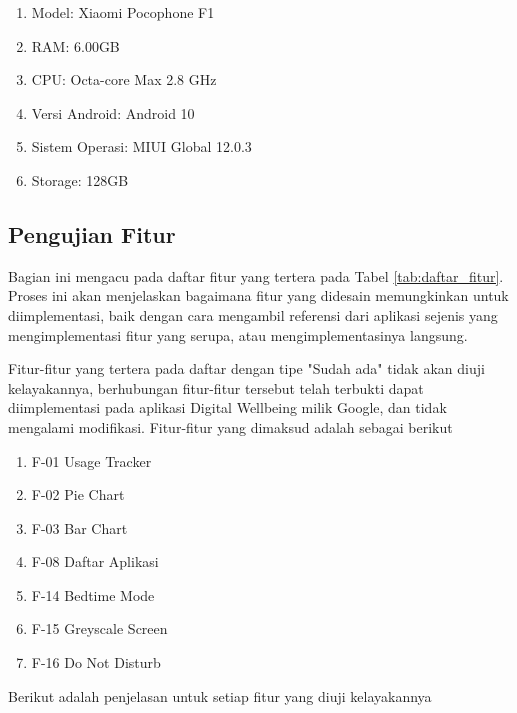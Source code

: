 \begin{enumerate}
  \item Model: Xiaomi Pocophone F1
  \item RAM: 6.00GB
  \item CPU: Octa-core Max 2.8 GHz
  \item Versi Android: Android 10
  \item Sistem Operasi: MIUI Global 12.0.3
  \item Storage: 128GB
\end{enumerate}

\subsection{Pengujian Fitur}

Bagian ini mengacu pada daftar fitur yang tertera pada Tabel \ref{tab:daftar_fitur}. Proses ini akan menjelaskan bagaimana fitur yang didesain memungkinkan untuk diimplementasi, baik dengan cara mengambil referensi dari aplikasi sejenis yang mengimplementasi fitur yang serupa, atau mengimplementasinya langsung.

Fitur-fitur yang tertera pada daftar dengan tipe "Sudah ada" tidak akan diuji kelayakannya, berhubungan fitur-fitur tersebut telah terbukti dapat diimplementasi pada aplikasi Digital Wellbeing milik Google, dan tidak mengalami modifikasi. Fitur-fitur yang dimaksud adalah sebagai berikut

\begin{enumerate}
  \item F-01 Usage Tracker
  \item F-02 Pie Chart
  \item F-03 Bar Chart
  \item F-08 Daftar Aplikasi
  \item F-14 Bedtime Mode
  \item F-15 Greyscale Screen
  \item F-16 Do Not Disturb  
\end{enumerate}

Berikut adalah penjelasan untuk setiap fitur yang diuji kelayakannya